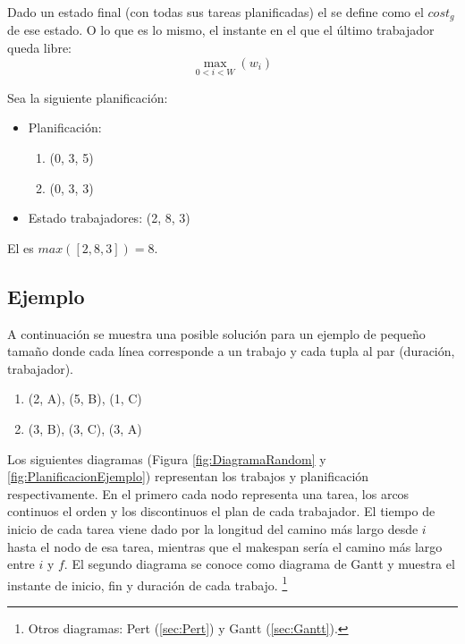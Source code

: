 Dado un estado final (con todas sus tareas planificadas)
el  se define como el $cost_g$ de ese estado.
O lo que es lo mismo, el instante en el que el último
trabajador queda libre:
$$
    \max_{0 < i < W}(w_i)
$$

\begin{examplebox}
    Sea la siguiente planificación:
    \begin{itemize}[itemsep=0.25px]
        \item Planificación:
        \begin{enumerate}[itemsep=0.25px]
            \item (0, 3, 5)
            \item (0, 3, 3)
        \end{enumerate}
        \item Estado trabajadores: (2, 8, 3)
    \end{itemize}

    El  es $max([2, 8, 3]) = 8$.
\end{examplebox}

\pagebreak
\subsection{Ejemplo}
\label{ssec:A*Example}

A continuación se muestra una posible solución para un ejemplo de pequeño tamaño
donde cada línea corresponde a un trabajo y cada tupla al par (duración, trabajador).
\begin{enumerate}[start=0, itemsep=0.25px]
    \item (2, A), (5, B), (1, C)
    \item (3, B), (3, C), (3, A)
\end{enumerate}

Los siguientes diagramas (Figura \ref{fig:DiagramaRandom} y \ref{fig:PlanificacionEjemplo})
representan los trabajos y planificación respectivamente.
En el primero cada nodo representa una tarea,
los arcos continuos el orden
y los discontinuos el plan de cada trabajador.
El tiempo de inicio
de cada tarea viene dado por la longitud del camino más largo
desde $i$ hasta el nodo de esa tarea,
mientras que el makespan sería el camino más largo entre $i$ y $f$.
El segundo diagrama se conoce como diagrama de Gantt y
muestra el instante de inicio, fin y duración de cada trabajo.
\footnote{
    Otros diagramas: Pert (\ref{sec:Pert}) y Gantt (\ref{sec:Gantt}).
}


